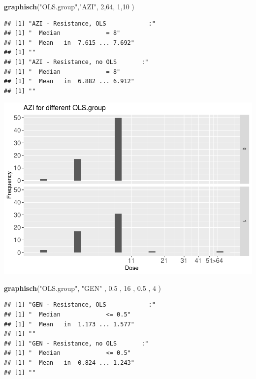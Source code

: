 \documentclass[
]{article}
\newenvironment{Shaded}{\begin{snugshade}}{\end{snugshade}}
\newcommand{\DecValTok}[1]{\textcolor[rgb]{0.00,0.00,0.81}{#1}}
\newcommand{\FloatTok}[1]{\textcolor[rgb]{0.00,0.00,0.81}{#1}}
\newcommand{\KeywordTok}[1]{\textcolor[rgb]{0.13,0.29,0.53}{\textbf{#1}}}
\newcommand{\NormalTok}[1]{#1}
\newcommand{\StringTok}[1]{\textcolor[rgb]{0.31,0.60,0.02}{#1}}
\begin{document}
\begin{Shaded}
\begin{Highlighting}[]
  \KeywordTok{graphisch}\NormalTok{(}\StringTok{"OLS.group"}\NormalTok{,}\StringTok{"AZI"}\NormalTok{, }\DecValTok{2}\NormalTok{,}\DecValTok{64}\NormalTok{, }\DecValTok{1}\NormalTok{,}\DecValTok{10}\NormalTok{    )}
\end{Highlighting}
\end{Shaded}

\begin{verbatim}
## [1] "AZI - Resistance, OLS            :"
## [1] "  Median             = 8"
## [1] "  Mean   in  7.615 ... 7.692"
## [1] ""
## [1] "AZI - Resistance, no OLS       :"
## [1] "  Median             = 8"
## [1] "  Mean   in  6.882 ... 6.912"
## [1] ""
\end{verbatim}

\includegraphics{Verteilungen_files/figure-latex/unnamed-chunk-21-1.pdf}

\begin{Shaded}
\begin{Highlighting}[]
  \KeywordTok{graphisch}\NormalTok{(}\StringTok{"OLS.group"}\NormalTok{, }\StringTok{"GEN"}\NormalTok{ , }\FloatTok{0.5}\NormalTok{  ,  }\DecValTok{16}\NormalTok{   ,   }\FloatTok{0.5}\NormalTok{  ,   }\DecValTok{4}\NormalTok{    )}
\end{Highlighting}
\end{Shaded}

\begin{verbatim}
## [1] "GEN - Resistance, OLS            :"
## [1] "  Median             <= 0.5"
## [1] "  Mean   in  1.173 ... 1.577"
## [1] ""
## [1] "GEN - Resistance, no OLS       :"
## [1] "  Median             <= 0.5"
## [1] "  Mean   in  0.824 ... 1.243"
## [1] ""
\end{verbatim}
\end{document}
